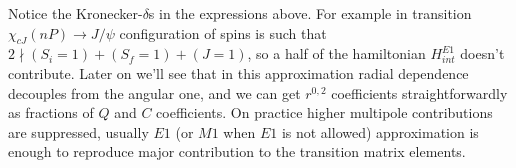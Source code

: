 Notice the Kronecker-$\delta$s in the expressions above. For example in transition $\chi_{cJ}(nP) \rightarrow J/\psi$ configuration of spins is such that $2 \nmid (S_i=1) + (S_f=1) + (J=1)$, so a half of the hamiltonian $H^{E1}_{int}$ doesn't contribute. Later on we'll see that in this approximation radial dependence decouples from the angular one, and we can get $r^{0,2}$ coefficients straightforwardly as fractions of $Q$ and $C$ coefficients. On practice higher multipole contributions are suppressed, usually $E1$ (or $M1$ when $E1$ is not allowed) approximation is enough to reproduce major contribution to the transition matrix elements.
